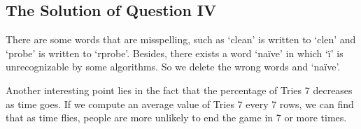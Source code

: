 \documentclass[12pt]{article}
\begin{document}
\subsection{The Solution of Question IV}
There are some words that are misspelling, such as ‘clean’ is written to ‘clen’ and ‘probe’ is written to ‘rprobe’. Besides, there exists a word ‘naïve’ in which ‘ï’ is unrecognizable by some algorithms. So we delete the wrong words and ‘naïve’. 

Another interesting point lies in the fact that the percentage of Tries 7 decreases as time goes. If we compute an average value of Tries 7 every 7 rows, we can find that as time flies, people are more unlikely to end the game in 7 or more times.


\begin{figure}[htbp]
	\centering
	\hspace{2mm}
	\hspace{2mm}
\end{figure}
\end{document}
